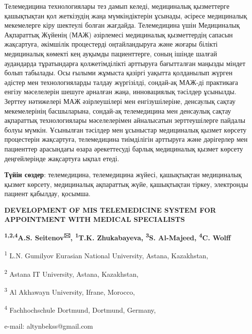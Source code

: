 Телемедицина технологиялары тез дамып келеді, медициналық қызметтерге
қашықтықтан қол жеткізудің жаңа мүмкіндіктерін ұсынады, әсіресе
медициналық мекемелерге кіру шектеулі болған жағдайда. Телемедицина үшін
Медициналық Ақпараттық Жүйенің (МАЖ) әзірлемесі медициналық қызметтердің
сапасын жақсартуға, әкімшілік процестерді оңтайландыруға және жоғары
білікті медициналық көмекті кең ауқымды пациенттерге, соның ішінде
шалғай аудандарда тұратындарға қолжетімділікті арттыруға бағытталған
маңызды міндет болып табылады. Осы ғылыми жұмыста қазіргі уақытта
қолданылып жүрген әдістер мен технологияларды талдау жүргізілді,
сондай-ақ МАЖ-ді практикаға енгізу мәселелерін шешуге арналған жаңа,
инновациялық тәсілдер ұсынылды. Зерттеу нәтижелері МАЖ әзірлеушілері мен
енгізушілеріне, денсаулық сақтау мекемелерінің басшыларына, сондай-ақ
телемедицина мен денсаулық сақтау ақпараттық технологиялары
мәселелерімен айналысатын зерттеушілерге пайдалы болуы мүмкін. Ұсынылған
тәсілдер мен ұсыныстар медициналық қызмет көрсету процестерін
жақсартуға, телемедицина тиімділігін арттыруға және дәрігерлер мен
пациенттер арасындағы өзара әрекеттесуді барлық медициналық қызмет
көрсету деңгейлерінде жақсартуға ықпал етеді.

{\bfseries Түйін сөздер}: телемедицина, телемедицина жүйесі, қашықтықтан
медициналық қызмет көрсету, медициналық ақпараттық жүйе, қашықтықтан
тіркеу, электронды пациент қабылдау, қосымша.

{\bfseries DEVELOPMENT OF MIS TELEMEDICINE SYSTEM FOR APPOINTMENT WITH
MEDICAL SPECIALISTS}

{\bfseries \textsuperscript{1,2,4}A.S. Seitenov\textsuperscript{🖂},
\textsuperscript{1}T.K. Zhukabayeva, \textsuperscript{3}S. Al-Majeed,
\textsuperscript{4}C. Wolff}

\textsuperscript{1} L.N. Gumilyov Eurasian National University, Astana,
Kazakhstan,

\textsuperscript{2} Astana IT University, Astana, Kazakhstan,

\textsuperscript{3} Al Akhawayn University, Ifrane, Morocco,

\textsuperscript{4} Fachhochschule Dortmund, Dortmund, Germany,

e-mail: altynbekss@gmail.com

